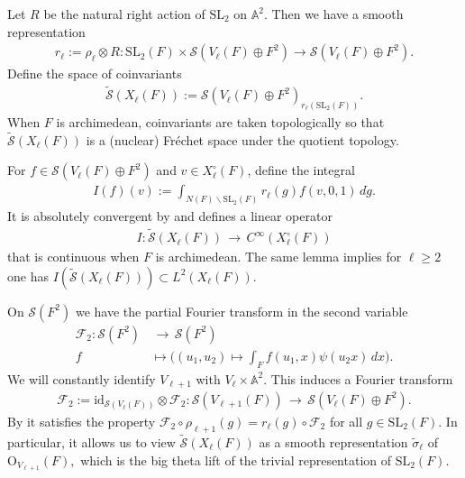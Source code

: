 \documentclass[11pt,a4paper,reqno]{amsart}
\theoremstyle{remark}
\numberwithin{equation}{section}
\newcommand{\A}{\mathbb{A}}
\newcommand{\SL}{\mathrm{SL}}
\newcommand{\lto}{\,\longrightarrow\,}
\theoremstyle{definition}
\numberwithin{equation}{section}
\begin{document}
Let $R$ be the natural right action of $\SL_2$ on $\A^2$. Then we have a smooth representation
\begin{align*}
    r_\ell:=\rho_\ell\otimes R:\SL_2(F)\times\mathcal{S}
(V_\ell(F)\oplus F^2)\to \mathcal{S}
(V_\ell(F)\oplus F^2).
\end{align*}
Define the space of coinvariants
\begin{align*}
    \widetilde{\mathcal{S}}(X_\ell(F)):=\mathcal{S}(V_\ell(F)\oplus F^2)_{r_\ell(\SL_2(F))}.
\end{align*} 
When $F$ is archimedean,  coinvariants are taken topologically so that $\widetilde{\mathcal{S}}(X_\ell(F))$ is a (nuclear) Fr\'echet space under the quotient topology.

For $f\in \mathcal{S}
(V_\ell(F)\oplus F^2)$ and $v\in X_\ell^\circ(F)$, define the integral
\begin{align*}
    I(f)(v):=\int_{N(F)\backslash \SL_2(F)} r_\ell(g)f(v,0,1)\, d\dot{g}.
\end{align*}
It is absolutely convergent by \cite[Lemma 3.1]{Getz:Quad} and defines a linear operator
\begin{align*}
    I:\widetilde{\mathcal{S}}(X_{\ell}(F))\lto C^\infty(X_\ell^\circ(F))
\end{align*}
that is continuous when $F$ is archimedean. The same lemma implies for $\ell \geq 2$ one has $I(\widetilde{\mathcal{S}}(X_{\ell}(F))) \subset  L^2(X_{{\ell}}(F)).$


On $\mathcal{S}(F^2)$ we have the partial Fourier transform in the second variable
\begin{align*}
    \mathcal{F}_2:\mathcal{S}(F^2)&\lto\mathcal{S}(F^2)\\
    f&\longmapsto \bigg((u_1,u_2)\mapsto \int_{F} f(u_1,x)\psi(u_2 x)\, dx\bigg).
\end{align*}
We will constantly identify $V_{\ell+1}$ with $V_\ell\times \A^2$. This induces a Fourier transform
\begin{align*}
    \mathcal{F}_2:=\mathrm{id}_{\mathcal{S}(V_\ell(F))}\otimes \mathcal{F}_2:\mathcal{S}(V_{\ell+1}(F))\lto \mathcal{S}(V_{\ell}(F)\oplus F^2).
\end{align*}
By \cite[Lemma 3.2]{Getz:Quad} it satisfies the property  
$\mathcal{F}_2\circ \rho_{\ell+1}(g)=r_\ell(g)\circ \mathcal{F}_2$ for all $g\in \SL_2(F)$. In particular, it allows us to view $\widetilde{\mathcal{S}}(X_{\ell}(F))$ as a smooth representation $\tilde{\sigma}_\ell$ of $\mathrm{O}_{V_{\ell+1}}(F),$ which is the big theta lift of the trivial representation of $\SL_2(F)$.
\end{document}
